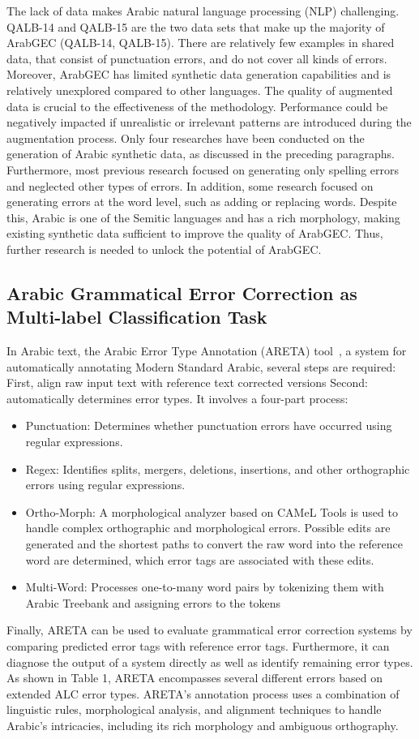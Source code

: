  The lack of data makes Arabic natural language processing (NLP) challenging. QALB-14 and QALB-15 are the two data sets that make up the majority of ArabGEC (QALB-14, QALB-15). There are relatively few examples in shared data, that consist of punctuation errors, and do not cover all kinds of errors. Moreover,  ArabGEC has limited synthetic data generation capabilities and is relatively unexplored compared to other languages. The quality of augmented data is crucial to the effectiveness of the methodology. Performance could be negatively impacted if unrealistic or irrelevant patterns are introduced during the augmentation process. Only four researches have been conducted on the generation of Arabic synthetic data, as discussed in the preceding paragraphs.  Furthermore, most previous research focused on generating only spelling errors and neglected other types of errors. In addition, some research focused on generating errors at the word level, such as adding or replacing words. Despite this, Arabic is one of the Semitic languages and has a rich morphology, making existing synthetic data sufficient to improve the quality of ArabGEC. Thus, further research is needed to unlock the potential of ArabGEC.
 \subsection{Arabic Grammatical Error Correction as Multi-label Classification Task}
 In Arabic text, the Arabic Error Type Annotation (ARETA) tool~\cite{belkebir2021automatic}, a system for automatically annotating Modern Standard Arabic, several steps are required: First, align raw input text with reference text corrected versions
Second: automatically determines error types. It involves a four-part process:
\begin{itemize}[noitemsep, topsep=0pt]
\item Punctuation: Determines whether punctuation errors have occurred using regular expressions.
\item Regex: Identifies splits, mergers, deletions, insertions, and other orthographic errors using regular expressions.
\item Ortho-Morph: A morphological analyzer based on CAMeL Tools is used to handle complex orthographic and morphological errors. Possible edits are generated and the shortest paths to convert the raw word into the reference word are determined, which error tags are associated with these edits.
\item Multi-Word: Processes one-to-many word pairs by tokenizing them with Arabic Treebank and assigning errors to the tokens
\end{itemize}
Finally, ARETA can be used to evaluate grammatical error correction systems by comparing predicted error tags with reference error tags. Furthermore, it can diagnose the output of a system directly as well as identify remaining error types.
As shown in Table 1, ARETA encompasses several different errors based on extended ALC error types. ARETA's annotation process uses a combination of linguistic rules, morphological analysis, and alignment techniques to handle Arabic's intricacies, including its rich morphology and ambiguous orthography.

